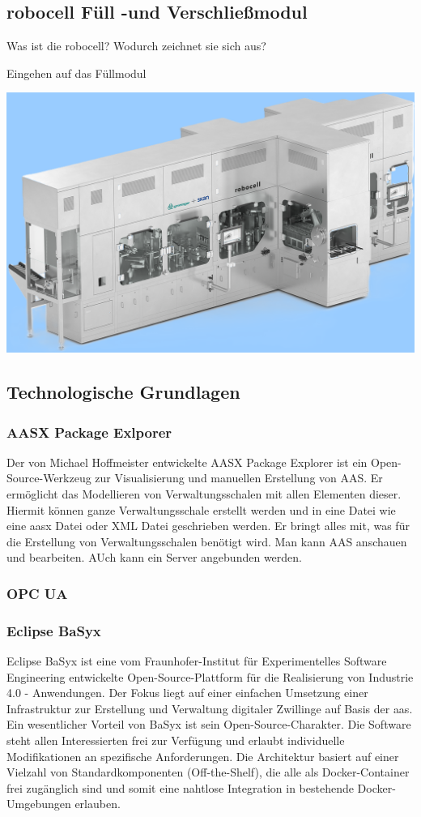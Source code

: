 %

\subsection{robocell Füll -und Verschließmodul}

Was ist die robocell? Wodurch zeichnet sie sich aus?

Eingehen auf das Füllmodul


\includegraphics{Bilder/robocell_FS2_rgb_Logo.png}
\subsection{Technologische Grundlagen}
\subsubsection{AASX Package Exlporer}
Der von Michael Hoffmeister entwickelte AASX Package Explorer ist ein Open-Source-Werkzeug zur Visualisierung und manuellen Erstellung von AAS.
Er ermöglicht das Modellieren von Verwaltungsschalen mit allen Elementen dieser.
Hiermit können ganze Verwaltungsschale erstellt werden und in eine Datei wie eine aasx Datei oder XML Datei geschrieben werden.
Er bringt alles mit, was für die Erstellung von Verwaltungsschalen benötigt wird.
Man kann AAS anschauen und bearbeiten.
AUch kann ein Server angebunden werden.
\subsubsection{OPC UA}
\newpage
\subsubsection{Eclipse BaSyx }
Eclipse BaSyx ist eine vom Fraunhofer-Institut für Experimentelles Software Engineering entwickelte Open-Source-Plattform für die Realisierung von Industrie 4.0 - Anwendungen.
Der Fokus liegt auf einer einfachen Umsetzung einer Infrastruktur zur Erstellung und Verwaltung digitaler Zwillinge auf Basis der \acs{aas}.
Ein wesentlicher Vorteil von BaSyx ist sein Open-Source-Charakter. Die Software steht allen Interessierten frei zur Verfügung und erlaubt individuelle Modifikationen an spezifische Anforderungen.
Die Architektur basiert auf einer Vielzahl von Standardkomponenten (Off-the-Shelf), die alle als Docker-Container frei zugänglich sind und somit eine nahtlose Integration in bestehende Docker-Umgebungen erlauben.


